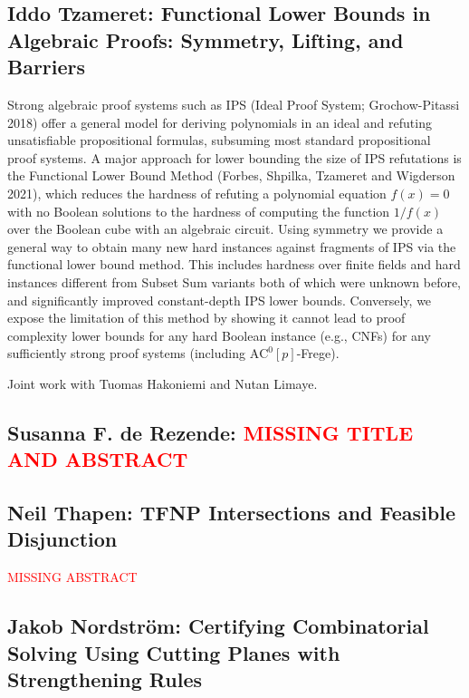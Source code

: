\documentclass[11pt]{article}
\begin{document}
\subsection*{Iddo Tzameret: Functional Lower Bounds in Algebraic Proofs: Symmetry,
Lifting, and Barriers}\label{Tzameret}

Strong algebraic proof systems such as IPS (Ideal Proof System; Grochow-Pitassi 2018)
offer a general model for deriving polynomials in an ideal and refuting unsatisfiable propositional
formulas, subsuming most standard propositional proof systems. A major approach for lower
bounding the size of IPS refutations is the Functional Lower Bound Method (Forbes, Shpilka,
Tzameret and Wigderson 2021), which reduces the hardness of refuting a polynomial
equation $f(x) = 0$ with no Boolean solutions to the hardness of computing the function $1/f(x)$
over the Boolean cube with an algebraic circuit. Using symmetry we provide a general way to
obtain many new hard instances against fragments of IPS via the functional lower bound method.
This includes hardness over finite fields and hard instances different from Subset Sum variants
both of which were unknown before, and significantly improved constant-depth IPS lower bounds. 
Conversely, we expose the limitation of this method by showing it cannot lead to proof complexity 
lower bounds for any hard Boolean instance (e.g., CNFs) for any sufficiently strong proof systems 
(including $\mathrm{AC}^0[p]$-Frege).

Joint work with Tuomas Hakoniemi and Nutan Limaye.






\subsection*{Susanna F. de Rezende: \textcolor{red}{MISSING TITLE AND ABSTRACT}}\label{Rezende}


\subsection*{Neil Thapen: TFNP Intersections and Feasible Disjunction}\label{Thapen}
\textcolor{red}{MISSING ABSTRACT}

\subsection*{Jakob Nordstr\"{o}m: Certifying Combinatorial Solving Using Cutting Planes with Strengthening Rules}\label{Nordstrom}
\end{document}
